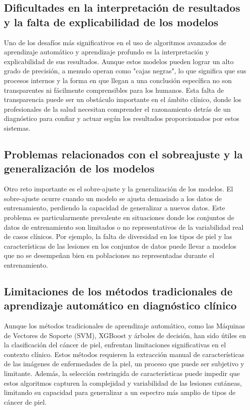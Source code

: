 \subsection*{Dificultades en la interpretación de resultados y la falta de explicabilidad de los modelos}

Uno de los desafíos más significativos en el uso de algoritmos avanzados de aprendizaje automático y aprendizaje profundo es la interpretación y explicabilidad de sus resultados. Aunque estos modelos pueden lograr un alto grado de precisión, a menudo operan como "cajas negras", lo que significa que sus procesos internos y la forma en que llegan a una conclusión específica no son transparentes ni fácilmente comprensibles para los humanos. Esta falta de transparencia puede ser un obstáculo importante en el ámbito clínico, donde los profesionales de la salud necesitan comprender el razonamiento detrás de un diagnóstico para confiar y actuar según los resultados proporcionados por estos sistemas. 


\subsection*{Problemas relacionados con el sobreajuste y la generalización de los modelos}
Otro reto importante es el sobre-ajuste y la generalización de los modelos. El sobre-ajuste ocurre cuando un modelo se ajusta demasiado a los datos de entrenamiento, perdiendo la capacidad de generalizar a nuevos datos. Este problema es particularmente prevalente en situaciones donde los conjuntos de datos de entrenamiento son limitados o no representativos de la variabilidad real de casos clínicos. Por ejemplo, la falta de diversidad en los tipos de piel y las características de las lesiones en los conjuntos de datos puede llevar a modelos que no se desempeñan bien en poblaciones no representadas durante el entrenamiento. 

\subsection*{Limitaciones de los métodos tradicionales de aprendizaje automático en diagnóstico clínico}
Aunque los métodos tradicionales de aprendizaje automático, como las Máquinas de Vectores de Soporte (SVM), XGBoost y árboles de decisión, han sido útiles en la clasificación del cáncer de piel, enfrentan limitaciones significativas en el contexto clínico. Estos métodos requieren la extracción manual de características de las imágenes de enfermedades de la piel, un proceso que puede ser subjetivo y limitante. Además, la selección restringida de características puede impedir que estos algoritmos capturen la complejidad y variabilidad de las lesiones cutáneas, limitando su capacidad para generalizar a un espectro más amplio de tipos de cáncer de piel. 

